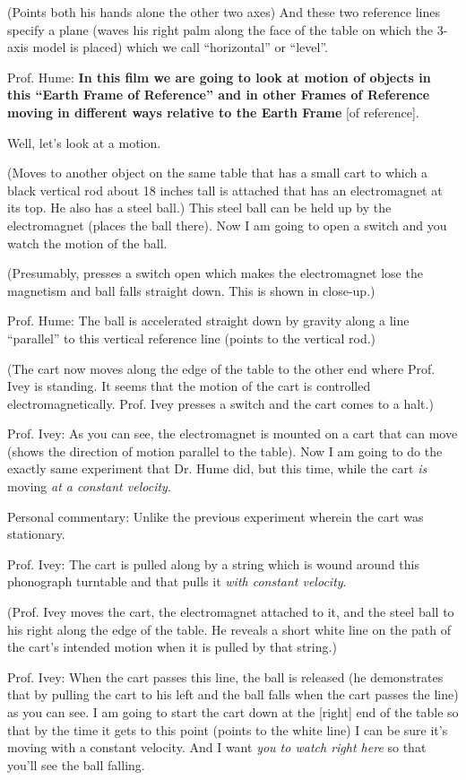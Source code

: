 \documentclass[a6paper]{article}
\newcommand{\perscom}[1]{
    {\footnotesize Personal commentary:  #1}
}
\begin{document}
(Points both his hands alone the other two axes) And these two reference lines specify a plane (waves his right palm along the face of the table on which the 3-axis model is placed) which we call ``horizontal'' or ``level''. 

Prof. Hume: \textbf{In this film we are going to look at motion of objects in this ``Earth Frame of Reference'' and in other Frames of Reference moving in different ways relative to the Earth Frame} [of reference].

Well, let's look at a motion.

(Moves to another object on the same table that has a small cart to which a black vertical rod about 18 inches tall is attached that has an electromagnet at its top. He also has a steel ball.) This steel ball can be held up by the electromagnet (places the ball there). Now I am going to open a switch and you watch the motion of the ball.

(Presumably, presses a switch open which makes the electromagnet lose the magnetism and ball falls straight down. This is shown in close-up.)

Prof. Hume: The ball is accelerated straight down by gravity along a line ``parallel'' to this vertical reference line (points to the vertical rod.) 

(The cart now moves along the edge of the table to the other end where Prof. Ivey is standing. It seems that the motion of the cart is controlled electromagnetically. Prof. Ivey presses a switch and the cart comes to a halt.)

Prof. Ivey: As you can see, the electromagnet is mounted on a cart that can move (shows the direction of motion parallel to the table). Now I am going to do the exactly same experiment that Dr. Hume did, but this time, while the cart \emph{is} moving \emph{at a constant velocity}.

\perscom{ Unlike the previous experiment wherein the cart was stationary. }

Prof. Ivey: The cart is pulled along by a string which is wound around this phonograph turntable and that pulls it \emph{with constant velocity}.

(Prof. Ivey moves the cart, the electromagnet attached to it, and the steel ball to his right along the edge of the table. He reveals a short white line on the path of the cart's intended motion when it is pulled by that string.)

Prof. Ivey: When the cart passes this line, the ball is released (he demonstrates that by pulling the cart to his left and the ball falls when the cart passes the line) as you can see. I am going to start the cart down at the [right] end of the table so that by the time it gets to this point (points to the white line) I can be sure it's moving with a constant velocity. And I want \emph{you to watch right here} so that you'll see the ball falling. 
\end{document}
